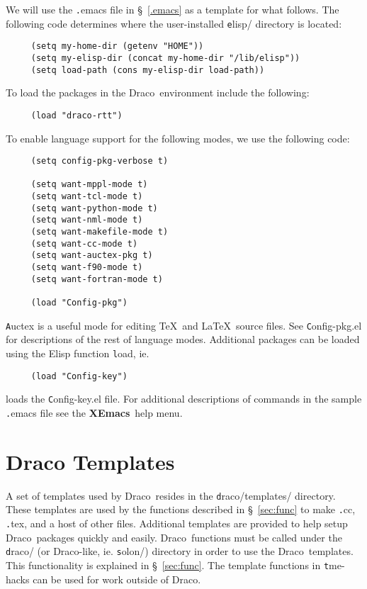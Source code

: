 \documentclass[11pt]{nmemo}
\newcommand{\comp}[1]{{\normalfont\texttt#1}}
\newcommand{\draco}{{\normalfont\sffamily Draco}}
\newcommand{\xemacs}{{\normalfont\bfseries XEmacs}}
\begin{document}
We will use the \comp{.emacs} file in \S~\ref{.emacs} as a template
for what follows.  The following code determines where the
user-installed \comp{elisp/} directory is located:
\begin{verbatim}
     (setq my-home-dir (getenv "HOME"))
     (setq my-elisp-dir (concat my-home-dir "/lib/elisp"))
     (setq load-path (cons my-elisp-dir load-path))
\end{verbatim}
To load the packages in the \draco\ environment include the following:
\begin{verbatim}
     (load "draco-rtt")
\end{verbatim}
To enable language support for the following modes, we use the
following code:
\begin{verbatim}
     (setq config-pkg-verbose t)

     (setq want-mppl-mode t)
     (setq want-tcl-mode t)
     (setq want-python-mode t)
     (setq want-nml-mode t)
     (setq want-makefile-mode t)
     (setq want-cc-mode t)
     (setq want-auctex-pkg t)
     (setq want-f90-mode t)
     (setq want-fortran-mode t)

     (load "Config-pkg")
\end{verbatim}
\comp{Auctex} is a useful mode for editing \TeX\ and \LaTeX\ source
files.  See \comp{Config-pkg.el} for descriptions of the rest of
language modes.  Additional packages can be loaded using the Elisp
function \comp{load}, ie. 
\begin{verbatim}
     (load "Config-key")
\end{verbatim}
loads the \comp{Config-key.el} file.  For additional descriptions of
commands in the sample \comp{.emacs} file see the \xemacs\ help menu.


\section{Draco Templates}

A set of templates used by \draco\ resides in the
\comp{draco/templates/} directory.  These templates are used by the
functions described in \S~\ref{sec:func} to make \comp{.cc},
\comp{.tex}, and a host of other files.  Additional templates are
provided to help setup \draco\ packages quickly and easily.  \draco\ 
functions must be called under the \comp{draco/} (or \draco-like, ie.
\comp{solon/}) directory in order to use the \draco\ templates.  This
functionality is explained in \S~\ref{sec:func}.  The template
functions in \comp{tme-hacks} can be used for work outside of \draco.
\end{document}
